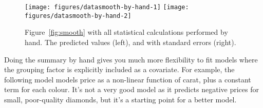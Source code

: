 \begin{Shaded}
\begin{Highlighting}[]
\StringTok{ }
  \StringTok{ }\StringTok{ } \NormalTok{), } 
  \StringTok{ }\NormalTok{(} \NormalTok{(}\NormalTok{, }\NormalTok{, } \NormalTok{))}
  \StringTok{ } 
  
  \StringTok{ }
  \StringTok{ }
\NormalTok{\}}
\StringTok{ }
  
   \NormalTok{)}
  
   \NormalTok{, } \StringTok{ } \NormalTok{*}\StringTok{ } \StringTok{ } \NormalTok{*}\StringTok{ }
\end{Highlighting}
\end{Shaded}

\begin{figure}
\texttt{[image: figures/datasmooth-by-hand-1]} \texttt{[image: figures/datasmooth-by-hand-2]} \caption{Figure~\ref{fig:smooth} with all statistical calculations performed by hand.  The predicted values (left), and with standard errors (right).\label{fig:smooth-by-hand}}
\end{figure}

Doing the summary by hand gives you much more flexibility to fit models
where the grouping factor is explicitly included as a covariate. For
example, the following model models price as a non-linear function of
carat, plus a constant term for each colour. It's not a very good model
as it predicts negative prices for small, poor-quality diamonds, but
it's a starting point for a better model.

